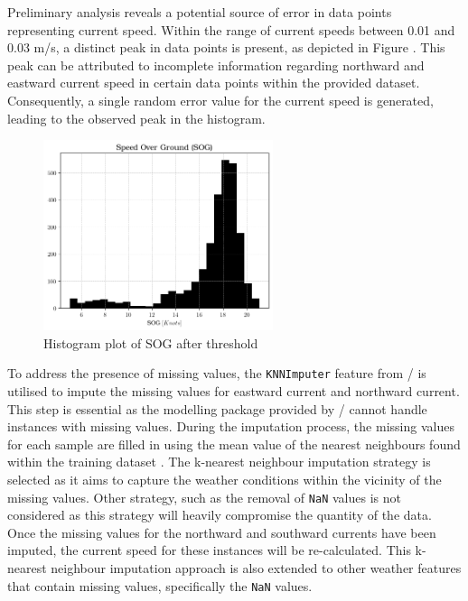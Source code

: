 Preliminary analysis reveals a potential source of error in data points representing current speed. Within the range of current speeds between 0.01 and 0.03 m/s, a distinct peak in data points is present, as depicted in Figure . This peak can be attributed to incomplete information regarding northward and eastward current speed in certain data points within the provided dataset. Consequently, a single random error value for the current speed is generated, leading to the observed peak in the histogram.\\

\begin{figure}[h]
    \centering
        \includegraphics[width=0.6\textwidth]{02_figures/hist_init_sog_postfilter.png}
        \caption{Histogram plot of SOG after threshold}
        \label{fig:SOG_greater_five}
\end{figure}

To address the presence of missing values, the \texttt{KNNImputer} feature from \scikit/ is utilised to impute the missing values for eastward current and northward current. This step is essential as the modelling package provided by \scikit/ cannot handle instances with missing values. During the imputation process, the missing values for each sample are filled in using the mean value of the nearest neighbours found within the training dataset . The k-nearest neighbour imputation strategy is selected as it aims to capture the weather conditions within the vicinity of the missing values. Other strategy, such as the removal of \texttt{NaN} values is not considered as this strategy will heavily compromise the quantity of the data. Once the missing values for the northward and southward currents have been imputed, the current speed for these instances will be re-calculated. This k-nearest neighbour imputation approach is also extended to other weather features that contain missing values, specifically the \texttt{NaN} values.\\

